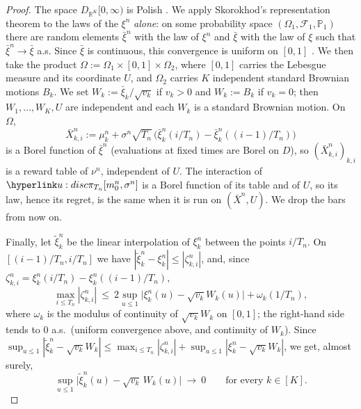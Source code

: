 \documentclass[11pt]{article}
\newcommand{\R}{\mathbb{R}}
\renewcommand{\P}{\mathbb{P}}
\newcommand{\1}{\mathbf{1}}
\begin{document}
\begin{proof}
The space $D_{\R^K}[0,\infty)$ is Polish \citep[Chap.~3, Thm~5.6]{EK86}. We apply Skorokhod's representation theorem \citep[Thm~6.7]{Bil99} to the laws of the
$\xi^n$ \emph{alone}: on some probability space $(\Omega_1,\mathcal F_1,\P_1)$ there are random elements $\bar\xi^n$ with the law of $\xi^n$ and $\bar\xi$ with
the law of $\xi$ such that $\bar\xi^n\to\bar\xi$ a.s. Since $\bar\xi$ is continuous, this convergence is uniform on $[0,1]$ \citep[Chap.~3, Sec.~10]{EK86}. We then
take the product $\Omega:=\Omega_1\times[0,1]\times\Omega_2$, where $[0,1]$ carries the Lebesgue measure and its coordinate $U$, and $\Omega_2$ carries $K$
independent standard Brownian motions $B_k$. We set $W_k:=\bar\xi_k/\sqrt{v_k}$ if $v_k>0$ and $W_k:=B_k$ if $v_k=0$; then $W_1,\dots,W_K,U$ are independent
and each $W_k$ is a standard Brownian motion. On $\Omega$,
\[
\bar X^n_{k,i}:=\mu^n_k+\sigma^n\sqrt{T_n}\,\big(\bar\xi^n_k(i/T_n)-\bar\xi^n_k((i-1)/T_n)\big)
\]
is a Borel function of $\bar\xi^n$ (evaluations at fixed times are Borel on $D$), so $(\bar X^n_{k,i})_{k,i}$ is a reward table of $\nu^n$, independent of $U$.
The interaction of $\uDisc{\pi}{T_n}{m^n_0,\sigma^n}$ is a Borel function of its table and of $U$, so its law, hence its regret, is the same when it is run on
$(\bar X^n,U)$. We drop the bars from now on.

Finally, let $\tilde\xi^n_k$ be the linear interpolation of $\xi^n_k$ between the points $i/T_n$. On $[(i-1)/T_n,i/T_n]$ we have
$|\tilde\xi^n_k-\xi^n_k|\le|\zeta^n_{k,i}|$, and, since $\zeta^n_{k,i}=\xi^n_k(i/T_n)-\xi^n_k((i-1)/T_n)$,
\[
\max_{i\le T_n}|\zeta^n_{k,i}|\ \le\ 2\sup_{u\le1}\big|\xi^n_k(u)-\sqrt{v_k}W_k(u)\big|+\omega_k(1/T_n),
\]
where $\omega_k$ is the modulus of continuity of $\sqrt{v_k}W_k$ on $[0,1]$; the right-hand side tends to $0$ a.s.\ (uniform convergence above, and continuity
of $W_k$). Since $\sup_{u\le1}|\tilde\xi^n_k-\sqrt{v_k}W_k|\le\max_{i\le T_n}|\zeta^n_{k,i}|+\sup_{u\le1}|\xi^n_k-\sqrt{v_k}W_k|$, we get, almost surely,
\begin{equation}\label{eq:u-unif}
\sup_{u\le1}\big|\tilde\xi^n_k(u)-\sqrt{v_k}\,W_k(u)\big|\ \longrightarrow\ 0\qquad\text{for every }k\in[K].
\end{equation}


\end{proof}
\end{document}
